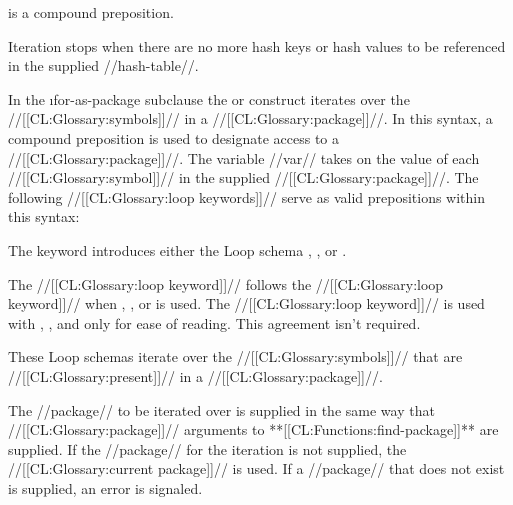 is a compound preposition.
 
Iteration stops when there are no more hash keys or hash values to be
referenced in the supplied //hash-table//.

\endsubsubsubsection%


In the \i{for-as-package} subclause
the  
or  construct                    
iterates over the //[[CL:Glossary:symbols]]// in a //[[CL:Glossary:package]]//.
In this syntax, a compound preposition is used to designate access to a
//[[CL:Glossary:package]]//.
The variable //var// takes on the value of each //[[CL:Glossary:symbol]]//
in the supplied //[[CL:Glossary:package]]//.  
 The following //[[CL:Glossary:loop keywords]]// serve as valid prepositions within this syntax:
 
\beginlist
 
 
The keyword  introduces either the Loop schema 
, ,  or .
 
 
The //[[CL:Glossary:loop keyword]]// 
follows the //[[CL:Glossary:loop keyword]]//  when , 
, or  is used.  
The //[[CL:Glossary:loop keyword]]//  is used with , 
, and  only for ease of reading.
This agreement isn't required.
 
 
These Loop schemas iterate over the //[[CL:Glossary:symbols]]// 
that are //[[CL:Glossary:present]]// in a //[[CL:Glossary:package]]//.


The //package// to be iterated over is supplied in the same way
that //[[CL:Glossary:package]]// arguments to **[[CL:Functions:find-package]]** are supplied.  
If the //package// for the iteration is not supplied, 
the //[[CL:Glossary:current package]]// is used.  
If a //package// that does not exist is supplied, 
an error  is signaled.
 
 
